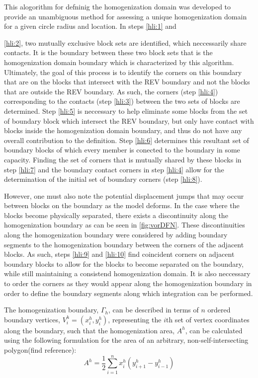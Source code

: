 This alogorithm for defninig the homogenization domain was developed to provide an unambiguous method for assessing a unique homogenization domain for a given circle radius and location. In steps \ref{hli:1} and {\ref{hli:2}, two mutually exclusive block sets are identified, which neccessarily share contacts. It is the boundary between these two block sets that is the homogenization domain boundary which is characterized by this algorithm. Ultimately, the goal of this process is to identify the corners on this boundary that are on the blocks that intersect with the REV boundary and not the blocks that are outside the REV boundary. As such, the corners (step \ref{hli:4}) corresponding to the contacts (step \ref{hli:3}) between the two sets of blocks are determined. Step \ref{hli:5} is neccessary to help eliminate some blocks from the set of boundary block which intersect the REV boundary, but only have contact with blocks inside the homogenization domain boundary, and thus do not have any overall contribution to the definition. Step \ref{hli:6} determines this resultant set of boundary blocks of which every member is conected to the boundary in some capacity. Finding the set of corners that is mutually shared by these blocks in step \ref{hli:7} and the boundary contact corners in step \ref{hli:4} allow for the determination of the initial set of boundary corners (step \ref{hli:8}). 

However, one must also note the potential displacement jumps that may occur between blocks on the boundary as the model deforms. In the case where the blocks become physically separated, there exists a discontinuity along the homogenization boundary as can be seen in \ref{fig:vorDFN}. These discontinuities along the homogenization boundary were considered by adding boundary segments to the homogenization boundary between the corners of the adjacent blocks. As such, steps \ref{hli:9} and \ref{hli:10} find coincident corners on adjacent boundary blocks to allow for the blocks to become separated on the boundary, while still maintaining a consistend homogenization domain. It is also neccessary to order the corners as they would appear along the homogenization boundary in order to define the boundary segments along which integration can be performed. 

The homogenization boundary, $\Gamma_{h}$, can be described in terms of $n$ ordered boundary vertices, $V_{i}^{h} = (x_{i}^{h}, y_{i}^{h})$, representing the $i$th set of vertex coordinates along the boundary, such that the homogenization area, $A^h$, can be calculated using the following formulation for the area of an arbitrary, non-self-intersecting polygon(find reference):
\begin{equation}
\label{eqn:hom1}
A^h = \dfrac{1}{2} \sum_{i=1}^{n}x_i^h(y_{i+1}^h-y_{i-1}^h)
\end{equation}

}
